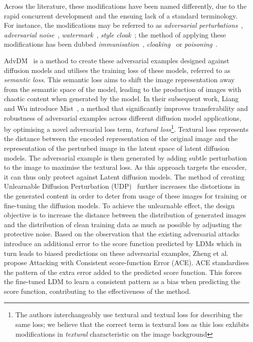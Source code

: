 \documentclass[conference,table]{IEEEtran} %
\begin{document}
Across the literature, these modifications have been named differently, due to the rapid concurrent development and the ensuing lack of a standard terminology. For instance, the modifications may be referred to as \textit{adversarial perturbations}~\cite{liang_adversarial_2023,liang_mist_2023}, \textit{adversarial noise}~\cite{zhao_unlearnable_2023}, \textit{watermark}~\cite{ye_duaw_2023}, \textit{style cloak}~\cite{shan_glaze_2023}; the method of applying these modifications has been dubbed \textit{immunisation}~\cite{salman_raising_2023}, \textit{cloaking}~\cite{shan_glaze_2023} or \textit{poisoning}~\cite{liu_toward_2023}. 
 
AdvDM~\cite{liang_adversarial_2023} is a method to create these adversarial examples designed against diffusion models and utilises the training loss of these models, referred to as \textit{semantic loss}. 
This semantic loss aims to shift the image representation away from the semantic space of the model, leading to the production of images with chaotic content when generated by the model.
In their subsequent work, Liang and Wu introduce Mist~\cite{liang_mist_2023}, a method that significantly improves transferability and robustness of adversarial examples across different diffusion model applications, by optimising a novel adversarial loss term, \textit{textural loss}\footnote{The authors interchangeably use textural and textual loss for describing the same loss; we believe that the correct term is textural loss as this loss exhibits modifications in \textit{textural} characteristic on the image background}. 
Textural loss represents the distance between the encoded representation of the original image and the representation of the perturbed image in the latent space of latent diffusion models. 
The adversarial example is then generated by adding subtle perturbation to the image to maximise the textural loss. As this approach targets the encoder, it can thus only protect against Latent diffusion models. %
The method of creating Unlearnable Diffusion Perturbation (UDP)~\cite{zhao_unlearnable_2023} further increases the distortions in the generated content in order to deter from usage of these images for training or fine-tuning the diffusion models. 
To achieve the unlearnable effect, the design objective is to increase the distance between the distribution of generated images and the distribution of clean training data as much as possible by adjusting the protective noise.
Based on the observation that the existing adversarial attacks introduce an additional error to the score function predicted by LDMs which in turn leads to biased predictions on these adversarial examples, Zheng et al.~\cite{zheng_understanding_2023} propose Attacking with Consistent score-function Error (ACE).
ACE standardises the pattern of the extra error added to the predicted score function. 
This forces the fine-tuned LDM to learn a consistent pattern as a bias when predicting the score function, contributing to the effectiveness of the method.
\end{document}
